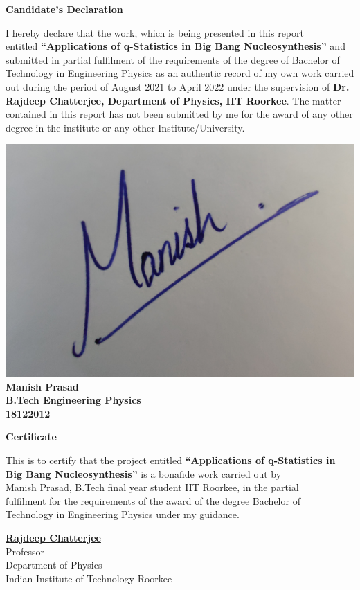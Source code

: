\documentclass[11pt]{article}
\numberwithin{equation}{section}
\begin{document}
\begin{center}
  \Large\textbf{Candidate’s Declaration}
\end{center}
I hereby declare that the work, which is being presented in this report \\ entitled \textbf{“Applications of q-Statistics in Big Bang Nucleosynthesis”} and submitted in partial fulfilment of the requirements of the degree of Bachelor of Technology in Engineering Physics  as an authentic record of my own work carried out during the period of August 2021 to April 2022 under the supervision of \textbf{Dr. Rajdeep Chatterjee, Department of Physics, IIT Roorkee}. The matter contained in this report has not been submitted by me for the award of any other degree in the institute or any other Institute/University.

\vspace*{5em}\noindent

\begin{flushleft}
\includegraphics[width=0.3\linewidth]{"./Figures/sign.jpg"}\\
\textbf{Manish Prasad}\\
\textbf{B.Tech Engineering Physics}\\
\textbf{18122012}
\end{flushleft}
\pagebreak



\begin{center}
  \Large\textbf{Certificate}
\end{center}
This is to certify that the project entitled \textbf{“Applications of q-Statistics in Big Bang Nucleosynthesis”} is a bonafide work carried out by \\ Manish Prasad, B.Tech final year student IIT Roorkee, in the partial \\ fulfilment for the requirements of the award of the degree Bachelor of \\ Technology in Engineering Physics under my guidance.


\vspace*{10em}\noindent
\begin{flushleft}
\href{https://ph.iitr.ac.in/~PH/rcfphfph}{\textbf{Rajdeep Chatterjee}}\\
Professor\\
Department of Physics\\
Indian Institute of Technology Roorkee\\
\end{flushleft}
\pagebreak
\end{document}
